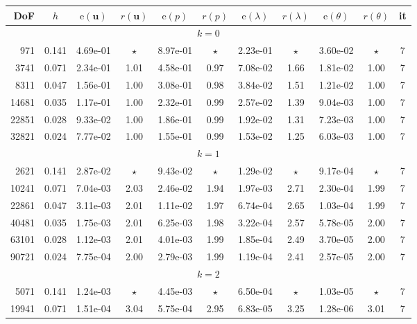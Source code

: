 \documentclass[onefignum,onetabnum,reqno,a4paper,final]{siamart250211}
\newcommand\bu{\boldsymbol{u}}
\newcommand\0{\mathbf{0}}
\numberwithin{figure}{section}
\numberwithin{table}{section}
\begin{document}
 \begin{table}[t!]
		\setlength{\tabcolsep}{3.5pt}
		\centering 
		{\small\begin{tabular}{|rcccccccccc|}
				\hline\hline
				DoF   &   $h$  & $\mathrm{e}(\bu)$  &   $r(\bu)$   &   $\mathrm{e}(p)$  &   $r(p)$  &  $\mathrm{e}(\lambda)$  &   $r(\lambda) $ &  $\mathrm{e}(\theta)$  &  $r(\theta)$  &   it \\
				\hline 
				\multicolumn{11}{|c|}{$k=0$} \\
				\hline
				971 & 0.141 & 4.69e-01 & $\star$ & 8.97e-01 & $\star$ & 2.23e-01 & $\star$ & 3.60e-02 & $\star$ &  7 \\
  3741 & 0.071 & 2.34e-01 & 1.01 & 4.58e-01 & 0.97 & 7.08e-02 & 1.66 & 1.81e-02 & 1.00 &  7 \\
  8311 & 0.047 & 1.56e-01 & 1.00 & 3.08e-01 & 0.98 & 3.84e-02 & 1.51 & 1.21e-02 & 1.00 &  7 \\
 14681 & 0.035 & 1.17e-01 & 1.00 & 2.32e-01 & 0.99 & 2.57e-02 & 1.39 & 9.04e-03 & 1.00 &  7 \\
 22851 & 0.028 & 9.33e-02 & 1.00 & 1.86e-01 & 0.99 & 1.92e-02 & 1.31 & 7.23e-03 & 1.00 &  7 \\
 32821 & 0.024 & 7.77e-02 & 1.00 & 1.55e-01 & 0.99 & 1.53e-02 & 1.25 & 6.03e-03 & 1.00 &  7 \\
				\hline
				\multicolumn{11}{|c|}{$k=1$}\\
				\hline
				 2621 & 0.141 & 2.87e-02 & $\star$ & 9.43e-02 & $\star$ & 1.29e-02 & $\star$ & 9.17e-04 & $\star$ &  7 \\
 10241 & 0.071 & 7.04e-03 & 2.03 & 2.46e-02 & 1.94 & 1.97e-03 & 2.71 & 2.30e-04 & 1.99 &  7 \\
 22861 & 0.047 & 3.11e-03 & 2.01 & 1.11e-02 & 1.97 & 6.74e-04 & 2.65 & 1.03e-04 & 1.99 &  7 \\
 40481 & 0.035 & 1.75e-03 & 2.01 & 6.25e-03 & 1.98 & 3.22e-04 & 2.57 & 5.78e-05 & 2.00 &  7 \\
 63101 & 0.028 & 1.12e-03 & 2.01 & 4.01e-03 & 1.99 & 1.85e-04 & 2.49 & 3.70e-05 & 2.00 &  7 \\
 90721 & 0.024 & 7.75e-04 & 2.00 & 2.79e-03 & 1.99 & 1.19e-04 & 2.41 & 2.57e-05 & 2.00 &  7 \\
 \hline
				\multicolumn{11}{|c|}{$k=2$}\\
				\hline
    5071 & 0.141 & 1.24e-03 & $\star$ & 4.45e-03 & $\star$ & 6.50e-04 & $\star$ & 1.03e-05 & $\star$ &  7 \\
 19941 & 0.071 & 1.51e-04 & 3.04 & 5.75e-04 & 2.95 & 6.83e-05 & 3.25 & 1.28e-06 & 3.01 &  7 \\

\end{tabular}}
\end{table}
\end{document}
